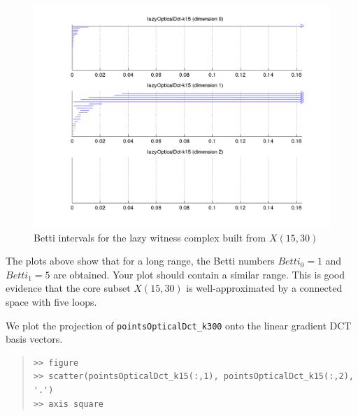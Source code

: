 \documentclass[amscd, amssymb, verbatim]{amsart}[12pt]
\theoremstyle{remark}
\theoremstyle{remark}
\theoremstyle{remark}
\begin{document}
\begin{figure}[htp]
	\begin{center}
    	\includegraphics[width=6in]{lazyOpticalDct-k15.png}
   	\end{center}
	\caption{Betti intervals for the lazy witness complex built from $X(15,30)$}
  	\label{fig:rangeBetti}
\end{figure}
\FloatBarrier

The plots above show that for a long range, the Betti numbers $Betti_0 = 1$ and $Betti_1 = 5$ are obtained. Your plot should contain a similar range. This is good evidence that the core subset $X(15,30)$ is well-approximated by a connected space with five loops. 

We plot the projection of \texttt{pointsOpticalDct\_k300} onto the linear gradient DCT basis vectors.

\begin{quote} \begin{verbatim}
>> figure
>> scatter(pointsOpticalDct_k15(:,1), pointsOpticalDct_k15(:,2), '.')
>> axis square
\end{verbatim} \end{quote}
\end{document}
